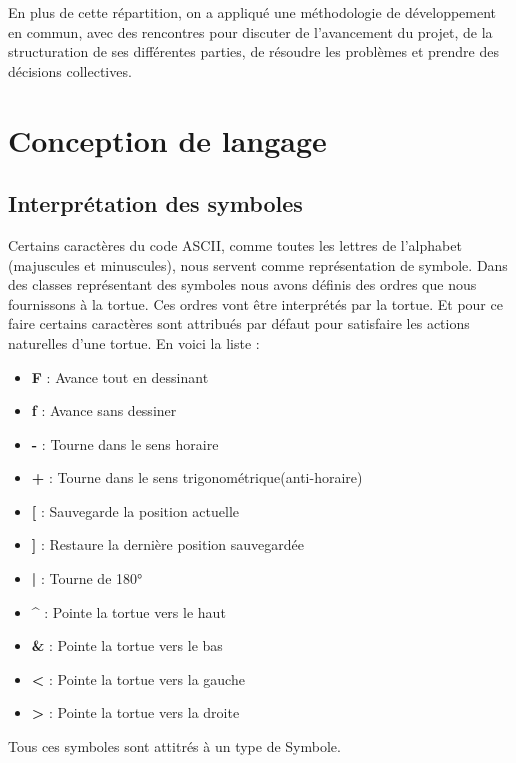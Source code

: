\documentclass[12pt]{article}
\begin{document}
En plus de cette répartition, on a appliqué une méthodologie de développement en commun, avec des rencontres pour discuter de l'avancement du projet, de la structuration de ses différentes parties, de résoudre les problèmes et prendre des décisions collectives.



\section{Conception de langage}




\subsection{Interprétation des symboles}
Certains caractères du code ASCII, comme toutes les lettres de l'alphabet (majuscules et minuscules), nous servent comme représentation de symbole. Dans des classes représentant des symboles nous avons définis des ordres que nous fournissons à la tortue. Ces ordres vont être interprétés par la tortue. Et pour ce faire certains caractères sont attribués par défaut pour satisfaire les actions naturelles d'une tortue. En voici la liste :\\
\begin{itemize}
	\item \textbf{F} : Avance tout en dessinant
	\item \textbf{f} : Avance sans dessiner
	\item \textbf{-} : Tourne dans le sens horaire 
	\item \textbf{+} : Tourne dans le sens trigonométrique(anti-horaire)
	\item \textbf{[} : Sauvegarde la position actuelle
	\item \textbf{]} : Restaure la dernière position sauvegardée
	\item \textbf{|} : Tourne de 180°
	\item \textbf{\^} : Pointe la tortue vers le haut
	\item \textbf{\&} : Pointe la tortue vers le bas
	\item \textbf{<} : Pointe la tortue vers la gauche
	\item \textbf{>} : Pointe la tortue vers la droite
\end{itemize}

Tous ces symboles sont attitrés à un type de Symbole.
\end{document}
